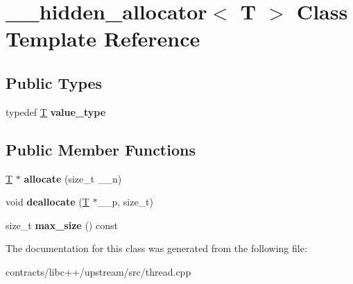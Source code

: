 \hypertarget{class____hidden__allocator}{}\section{\+\_\+\+\_\+hidden\+\_\+allocator$<$ T $>$ Class Template Reference}
\label{class____hidden__allocator}
\subsection*{Public Types}
\begin{DoxyCompactItemize}
\item 
\mbox{\label{class____hidden__allocator_ae3875ab366dbeedcac109e20a994eef3}} 
typedef \mbox{\hyperlink{struct_t}{T}} {\bfseries value\+\_\+type}
\end{DoxyCompactItemize}
\subsection*{Public Member Functions}
\begin{DoxyCompactItemize}
\item 
\mbox{\label{class____hidden__allocator_a586c35461c1230b2c9b6fd0fea96b82a}} 
\mbox{\hyperlink{struct_t}{T}} $\ast$ {\bfseries allocate} (size\+\_\+t \+\_\+\+\_\+n)
\item 
\mbox{\label{class____hidden__allocator_abc3efce3343146c562fe48e578abb5f4}} 
void {\bfseries deallocate} (\mbox{\hyperlink{struct_t}{T}} $\ast$\+\_\+\+\_\+p, size\+\_\+t)
\item 
\mbox{\label{class____hidden__allocator_adbcab1e4beb5cd96ddf5e533f7e99d0c}} 
size\+\_\+t {\bfseries max\+\_\+size} () const
\end{DoxyCompactItemize}


The documentation for this class was generated from the following file\+:\begin{DoxyCompactItemize}
\item 
contracts/libc++/upstream/src/thread.\+cpp\end{DoxyCompactItemize}
